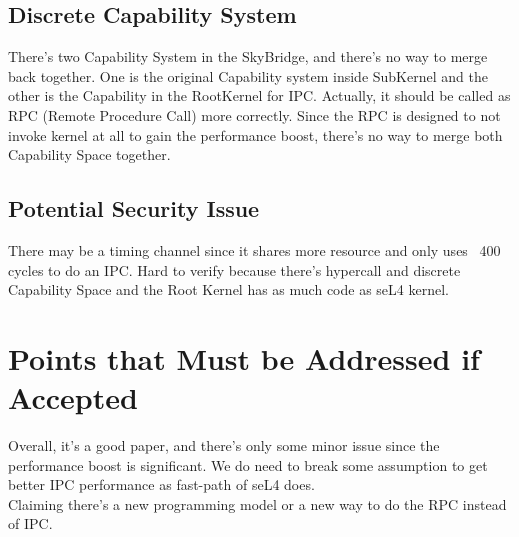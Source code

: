 \documentclass{article}
\begin{document}
\subsection{Discrete Capability System}

There's two Capability System in the SkyBridge, and there's no way to merge back together. One is the original Capability system inside SubKernel and the other is the Capability in the RootKernel for IPC. Actually, it should be called as RPC (Remote Procedure Call) more correctly. Since the RPC is designed to not invoke kernel at all to gain the performance boost, there's no way to merge both Capability Space together. 

\subsection{Potential Security Issue}

There may be a timing channel since it shares more resource and only uses ~400 cycles to do an IPC. Hard to verify because there's hypercall and discrete Capability Space and the Root Kernel has as much code as seL4 kernel.

\section{Points that Must be Addressed if Accepted}

Overall, it's a good paper, and there's only some minor issue since the performance boost is significant. We do need to break some assumption to get better IPC performance as fast-path of seL4 does. \\
Claiming there's a new programming model or a new way to do the RPC instead of IPC. 
\end{document}
